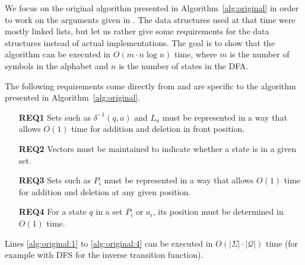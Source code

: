 \documentclass[12pt, a4 paper]{article}
\theoremstyle{definition}
\begin{document}
We focus on the original algorithm presented in Algorithm~\ref{alg:original} in order to work on the arguments given in \cite{Hop71}. The data structures used at that time were mostly linked lists, but let us rather give some requirements for the data structures instead of actual implementations. The goal is to show that the algorithm can be executed in $O(m \cdot n \log n)$ time, where $m$ is the number of symbols in the alphabet and $n$ is the number of states in the DFA.

The following requirements come directly from \cite{Hop71} and are specific to the algorithm presented in Algorithm~\ref{alg:original}.
\begin{itemize}
    \item[\bf REQ1] Sets such as $\delta^{-1}(q, a)$ and $L_a$ must be represented in a way that allows $O(1)$ time for addition and deletion in front position.
    \item[\bf REQ2] Vectors must be maintained to indicate whether a state is in a given set.
    \item[\bf REQ3] Sets such as $P_i$ must be represented in a way that allows $O(1)$ time for addition and deletion at any given position.
    \item[\bf REQ4] For a state $q$ in a set $P_i$ or $a_i$, its position must be determined in $O(1)$ time.
\end{itemize}

Lines \ref{alg:original:1} to \ref{alg:original:4} can be executed in $O(\left| \Sigma \right| \cdot \left| \mathcal{Q} \right|)$ time (for example with DFS for the inverse transition function).


% 

\pagebreak


\end{document}
